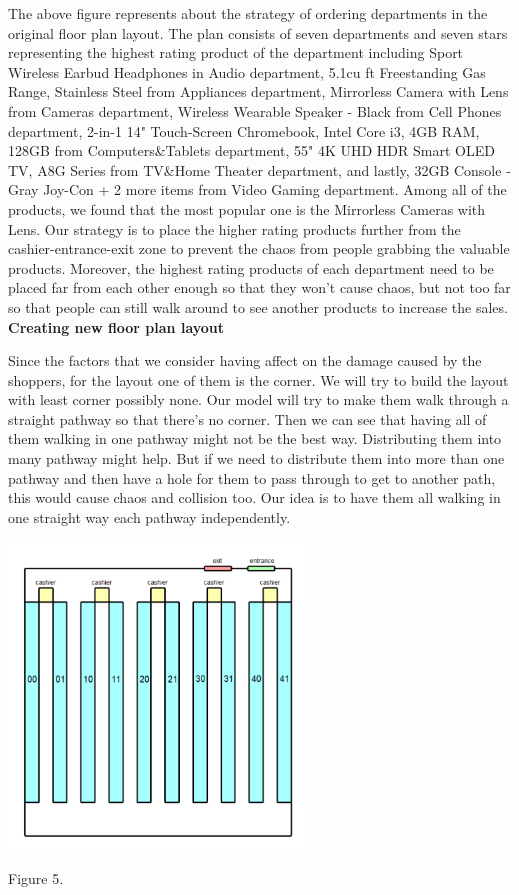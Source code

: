\par The above figure represents about the strategy of ordering departments in the original floor plan layout. The plan consists of seven departments and seven stars representing the highest rating product of the department including Sport Wireless Earbud Headphones in Audio department, 5.1cu ft Freestanding Gas Range, Stainless Steel from Appliances department, Mirrorless Camera with Lens from Cameras department, Wireless Wearable Speaker - Black from Cell Phones department, 2-in-1 14" Touch-Screen Chromebook, Intel Core i3, 4GB RAM, 128GB from Computers\&Tablets department, 55" 4K UHD HDR Smart OLED TV, A8G Series from TV\&Home Theater department, and lastly, 32GB Console - Gray Joy-Con + 2 more items from Video Gaming department. Among all of the products, we found that the most popular one is the Mirrorless Cameras with Lens. Our strategy is to place the higher rating products further from the cashier-entrance-exit zone to prevent the chaos from people grabbing the valuable products. Moreover, the highest rating products of each department need to be placed far from each other enough so that they won't cause chaos, but not too far so that people can still walk around to see another products to increase the sales. \newline
\noindent \textbf{Creating new floor plan layout}
\newline
\par Since the factors that we consider having affect on the damage caused by the shoppers, for the layout one of them is the corner. We will try to build the layout with least corner possibly none. Our model will try to make them walk through a straight pathway so that there's no corner. Then we can see that having all of them walking in one pathway might not be the best way. Distributing them into many pathway might help. But if we need to distribute them into more than one pathway and then have a hole for them to pass through to get to another path, this would cause chaos and collision too. Our idea is to have them all walking in one straight way each pathway independently.
\newline
\begin{center}
\includegraphics[width=0.6\textwidth]{fig4.1.PNG} 
\end{center}
\begin{center}
Figure 5.
\end{center}

